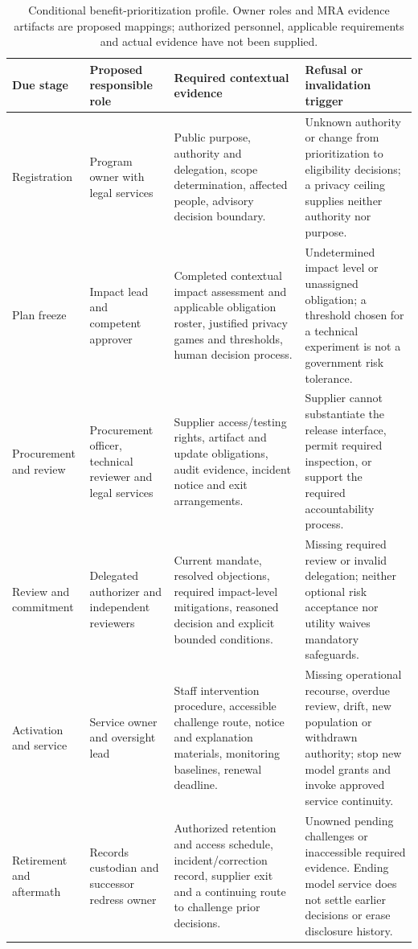 \begin{table}[t]
\centering\footnotesize
\caption{Conditional benefit-prioritization profile. Owner roles and MRA
evidence artifacts are proposed mappings; authorized personnel, applicable
requirements and actual evidence have not been supplied.}
\label{tab:gov-walkthrough}
\begin{tabularx}{\textwidth}{@{}p{}p{}XX@{}}
\toprule
Due stage & Proposed responsible role & Required contextual evidence & Refusal or invalidation trigger \\
\midrule
Registration & Program owner with legal services & Public purpose, authority and delegation, scope determination, affected people, advisory decision boundary. & Unknown authority or change from prioritization to eligibility decisions; a privacy ceiling supplies neither authority nor purpose. \\
Plan freeze & Impact lead and competent approver & Completed contextual impact assessment and applicable obligation roster, justified privacy games and thresholds, human decision process. & Undetermined impact level or unassigned obligation; a threshold chosen for a technical experiment is not a government risk tolerance. \\
Procurement and review & Procurement officer, technical reviewer and legal services & Supplier access/testing rights, artifact and update obligations, audit evidence, incident notice and exit arrangements. & Supplier cannot substantiate the release interface, permit required inspection, or support the required accountability process. \\
Review and commitment & Delegated authorizer and independent reviewers & Current mandate, resolved objections, required impact-level mitigations, reasoned decision and explicit bounded conditions. & Missing required review or invalid delegation; neither optional risk acceptance nor utility waives mandatory safeguards. \\
Activation and service & Service owner and oversight lead & Staff intervention procedure, accessible challenge route, notice and explanation materials, monitoring baselines, renewal deadline. & Missing operational recourse, overdue review, drift, new population or withdrawn authority; stop new model grants and invoke approved service continuity. \\
Retirement and aftermath & Records custodian and successor redress owner & Authorized retention and access schedule, incident/correction record, supplier exit and a continuing route to challenge prior decisions. & Unowned pending challenges or inaccessible required evidence. Ending model service does not settle earlier decisions or erase disclosure history. \\
\bottomrule
\end{tabularx}
\end{table}

